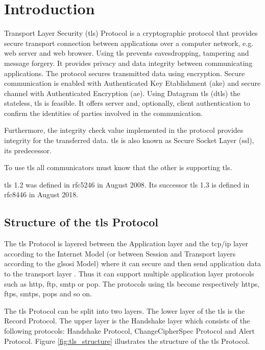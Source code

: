 \chapter{Introduction}
\label{chap:introduction}

Transport Layer Security (\gls{tls}) Protocol is a cryptographic protocol that provides secure transport connection between applications over a computer network, e.g. web server and web browser. 
Using \gls{tls} prevents eavesdropping, tampering and message forgery. It provides privacy and data integrity between communicating applications. The protocol secures transmitted data using encryption. Secure communication is enabled with Authenticated Key Etablishment (\gls{ake}) and secure channel with Authenticated Encryption (\gls{ae}). 
Using Datagram \gls{tls} (\gls{dtls}) the stateless, \gls{tls} is feasible. It offers server and, optionally, client authentication to confirm the identities of parties involved in the communication. 
 
Furthermore, the integrity check value implemented in the protocol provides integrity for the transferred data. \gls{tls} is also known as Secure Socket Layer (\gls{ssl}), its predecessor. 
 
To use \gls{tls} all communicators must know that the other is supporting \gls{tls}.

\gls{tls} 1.2 was defined in \gls{rfc}5246 in August 2008. Its successor \gls{tls} 1.3 is defined in \gls{rfc}8446 in August 2018.
 \cite{RFC5246}\cite{ms:overview}

\section{Structure of the \gls{tls} Protocol}
\label{sec:stucture}

The \gls{tls} Protocol is layered between the Application layer and the \gls{tcp}/\gls{ip} layer according to the Internet Model (or between Session and Transport layers according to the gls{osi} Model) where it can secure and then send application data to the transport layer \cite{ms:overview}. Thus it can support multiple application layer protocols such as \gls{http}, \gls{ftp}, \gls{smtp} or \gls{pop}. The protocols using \gls{tls} become respectively \gls{https}, \gls{ftps}, \gls{smtps}, \gls{pops} and so on.

The \gls{tls} Protocol can be split into two layers. The lower layer of the \gls{tls} is the Record Protocol. The upper layer is the Handshake layer which consists of the following protocols: Handshake Protocol, ChangeCipherSpec Protocol and Alert Protocol. Figure \ref{fig:tls_structure} illustrates the structure of the \gls{tls} Protocol. 
\cite{tlsstrukt}

